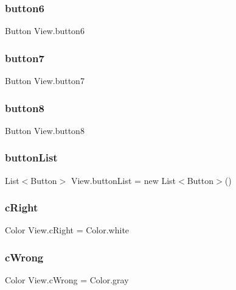 \subsubsection{\texorpdfstring{button6}{button6}}
{\footnotesize\ttfamily Button View.\+button6}

\mbox{\label{classView_a56874d01e74b8a37e0019ce81ce5c8ed}} 
\subsubsection{\texorpdfstring{button7}{button7}}
{\footnotesize\ttfamily Button View.\+button7}

\mbox{\label{classView_a7fe9a1e5d0ef962a54e00fe4b7815c1b}} 
\subsubsection{\texorpdfstring{button8}{button8}}
{\footnotesize\ttfamily Button View.\+button8}

\mbox{\label{classView_a43cf4c0712a5ee52704dd6a0c2dd1ae3}} 
\subsubsection{\texorpdfstring{button\+List}{buttonList}}
{\footnotesize\ttfamily List$<$Button$>$ View.\+button\+List = new List$<$Button$>$()}

\mbox{\label{classView_a5f3012dbcce0ef379184c6e672d8fd5d}} 
\subsubsection{\texorpdfstring{c\+Right}{cRight}}
{\footnotesize\ttfamily Color View.\+c\+Right = Color.\+white}

\mbox{\label{classView_a2e814ae916d1d796691e15899af94940}} 
\subsubsection{\texorpdfstring{c\+Wrong}{cWrong}}
{\footnotesize\ttfamily Color View.\+c\+Wrong = Color.\+gray}

